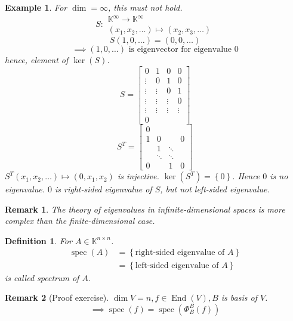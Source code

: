 \documentclass[a4paper]{article}
\newcounter{lecref}[section]
\numberwithin{lecref}{section}
\newtheorem{example}[lecref]{Example}
\newtheorem{definition}[lecref]{Definition}
\newtheorem*{Remark}{Remark}
\newcommand{\set}[1]{\left\{#1\right\}}
\begin{document}
\begin{example} %
  For $\dim = \infty$, this must not hold.
  \[ S: \begin{array}{c} \mathbb K^\infty \to \mathbb K^\infty \\ (x_1, x_2, \dots) \mapsto (x_2, x_3, \dots) \end{array} \]
  \[ S(1, 0, \dots) = (0, 0, \dots) \]
  \[ \implies (1, 0, \dots) \text{ is eigenvector for eigenvalue } 0 \]
  hence, element of $\ker(S)$.
  \[
    S = \begin{bmatrix}
      0 & 1 & 0 & 0 \\
      \vdots & 0 & 1 & 0 \\
      \vdots & \vdots & 0 & 1 \\
      \vdots & \vdots & \vdots & 0 \\
      \vdots & \vdots & \vdots & \vdots \\
      0 & & &
    \end{bmatrix}
  \] \[
    S^T = \begin{bmatrix}
      0 & & & \\
      1 & 0 &  & 0 \\
        & 1 & \ddots & \\
        & \ddots & \ddots & \\
      0 &  & 1 & 0
    \end{bmatrix}
  \]
  $S^T(x_1, x_2, \dots) \mapsto (0, x_1, x_2)$ is injective.
  $\ker(S^T) = \set{0}$. Hence $0$ is no eigenvalue.
  $0$ is right-sided eigenvalue of $S$, but not left-sided eigenvalue.
\end{example}

\begin{Remark}
  The theory of eigenvalues in infinite-dimensional spaces is more complex than the finite-dimensional case.
\end{Remark}

\begin{definition} %
  For $A \in \mathbb K^{n \times n}$.
  \begin{align*}
    \operatorname{spec}(A) &= \set{\text{right-sided eigenvalue of } A} \\
        &= \set{\text{left-sided eigenvalue of } A}
  \end{align*}
  is called \emph{spectrum of $A$}.
\end{definition}

\begin{Remark}[Proof exercise]
  $\dim{V} = n, f \in \operatorname{End}(V), B$ is basis of $V$.
  \[ \implies \operatorname{spec}(f) = \operatorname{spec}(\Phi_B^B(f)) \]
\end{Remark}
\end{document}
